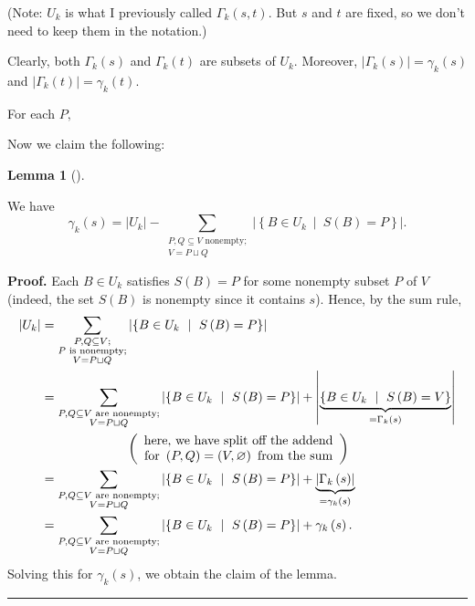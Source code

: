 \documentclass[numbers=enddot,12pt,final,onecolumn,notitlepage]{scrartcl}%
\theoremstyle{definition}
\newtheorem{lem}[theo]{Lemma}
\newenvironment{lemma}[1][]
{\begin{lem}[#1]\begin{leftbar}}
{\end{leftbar}\end{lem}}
\newenvironment{proof}[1][Proof]{\noindent\textbf{#1.} }{\ \rule{0.5em}{0.5em}}
\let\sumnonlimits\sum
\renewcommand{\sum}{\sumnonlimits\limits}
\theoremstyle{plainsl}
\begin{document}
(Note: $U_{k}$ is what I previously called $\Gamma_{k}\left(  s,t\right)  $.
But $s$ and $t$ are fixed, so we don't need to keep them in the notation.)

Clearly, both $\Gamma_{k}\left(  s\right)  $ and $\Gamma_{k}\left(  t\right)
$ are subsets of $U_{k}$. Moreover, $\left\vert \Gamma_{k}\left(  s\right)
\right\vert =\gamma_{k}\left(  s\right)  $ and $\left\vert \Gamma_{k}\left(
t\right)  \right\vert =\gamma_{k}\left(  t\right)  $.

For each $P,$

Now we claim the following:

\begin{lemma}
\label{lem.new1}We have%
\[
\gamma_{k}\left(  s\right)  =\left\vert U_{k}\right\vert -\sum
_{\substack{P,Q\subseteq V\text{ nonempty;}\\V=P\sqcup Q}}\left\vert \left\{
B\in U_{k}\ \mid\ S\left(  B\right)  =P\right\}  \right\vert .
\]

\end{lemma}

\begin{proof}
Each $B\in U_{k}$ satisfies $S\left(  B\right)  =P$ for some nonempty subset
$P$ of $V$ (indeed, the set $S\left(  B\right)  $ is nonempty since it
contains $s$). Hence, by the sum rule,%
\begin{align*}
\left\vert U_{k}\right\vert  & =\sum_{\substack{P,Q\subseteq V;\\P\text{ is
nonempty;}\\V=P\sqcup Q}}\left\vert \left\{  B\in U_{k}\ \mid\ S\left(
B\right)  =P\right\}  \right\vert \\
& =\sum_{\substack{P,Q\subseteq V\text{ are nonempty;}\\V=P\sqcup
Q}}\left\vert \left\{  B\in U_{k}\ \mid\ S\left(  B\right)  =P\right\}
\right\vert +\left\vert \underbrace{\left\{  B\in U_{k}\ \mid\ S\left(
B\right)  =V\right\}  }_{=\Gamma_{k}\left(  s\right)  }\right\vert \\
& \ \ \ \ \ \ \ \ \ \ \ \ \ \ \ \ \ \ \ \ \left(
\begin{array}
[c]{c}%
\text{here, we have split off the addend}\\
\text{for }\left(  P,Q\right)  =\left(  V,\varnothing\right)  \text{ from the
sum}%
\end{array}
\right)  \\
& =\sum_{\substack{P,Q\subseteq V\text{ are nonempty;}\\V=P\sqcup
Q}}\left\vert \left\{  B\in U_{k}\ \mid\ S\left(  B\right)  =P\right\}
\right\vert +\underbrace{\left\vert \Gamma_{k}\left(  s\right)  \right\vert
}_{=\gamma_{k}\left(  s\right)  }\\
& =\sum_{\substack{P,Q\subseteq V\text{ are nonempty;}\\V=P\sqcup
Q}}\left\vert \left\{  B\in U_{k}\ \mid\ S\left(  B\right)  =P\right\}
\right\vert +\gamma_{k}\left(  s\right)  .
\end{align*}
Solving this for $\gamma_{k}\left(  s\right)  $, we obtain the claim of the lemma.
\end{proof}
\end{document}
